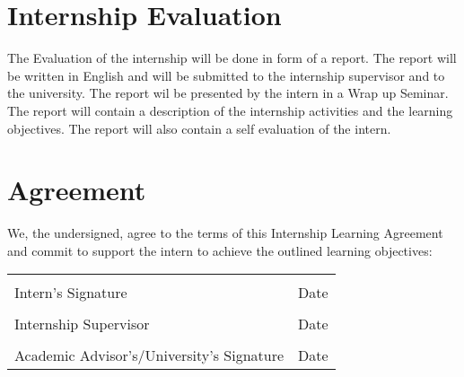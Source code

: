 \documentclass[11pt, titlepage, a4paper]{article}
\begin{document}
\section{Internship Evaluation}
The Evaluation of the internship will be done in form of a report. The report will be written in English and will be submitted to the internship supervisor and to the university. The report wil be presented by the intern in a Wrap up Seminar. The report will contain a description of the internship activities and the learning objectives. The report will also contain a self evaluation of the intern. 

\section{Agreement}

We, the undersigned, agree to the terms of this Internship Learning Agreement and commit to support the intern to achieve the outlined learning objectives:
\\

\noindent
\begin{tabular}{@{}p{2.5in}p{2.5in}@{}}
  \dotfill & \dotfill \\
  Intern's Signature & Date \\[5\bigskipamount]
  \dotfill & \dotfill \\
  Internship Supervisor & Date \\[5\bigskipamount]
  \dotfill & \dotfill \\
  Academic Advisor's/University's Signature & Date \\[5\bigskipamount]


\end{tabular}
\end{document}
